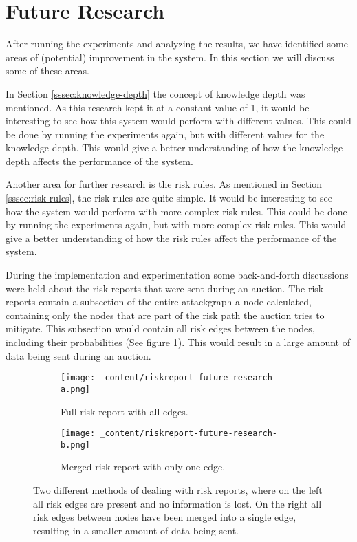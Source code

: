 \section{Future Research}
\label{sec:future-research}

After running the experiments and analyzing the results, we have identified some areas of (potential) improvement in the system. In this section we will discuss some of these areas.

In Section \ref{sssec:knowledge-depth} the concept of knowledge depth was mentioned. As this research kept it at a constant value of 1, it would be interesting to see how this system would perform with different values. This could be done by running the experiments again, but with different values for the knowledge depth. This would give a better understanding of how the knowledge depth affects the performance of the system.

Another area for further research is the risk rules. As mentioned in Section \ref{sssec:risk-rules}, the risk rules are quite simple. It would be interesting to see how the system would perform with more complex risk rules. This could be done by running the experiments again, but with more complex risk rules. This would give a better understanding of how the risk rules affect the performance of the system. 

During the implementation and experimentation some back-and-forth discussions were held about the risk reports that were sent during an auction. The risk reports contain a subsection of the entire attackgraph a node calculated, containing only the nodes that are part of the risk path the auction tries to mitigate. This subsection would contain all risk edges between the nodes, including their probabilities (See figure \ref{fig:riskreport-a}). This would result in a large amount of data being sent during an auction. 

\begin{figure}[H]
    \centering
    \begin{subfigure}[b]{0.4\textwidth}
        \centering
        \texttt{[image: \_content/riskreport-future-research-a.png]}
        \caption{Full risk report with all edges.}
        \label{fig:riskreport-a}
    \end{subfigure}
    \hspace{0.5cm}
    \begin{subfigure}[b]{0.4\textwidth}
        \centering
        \texttt{[image: \_content/riskreport-future-research-b.png]}
        \caption{Merged risk report with only one edge.}
        \label{fig:riskreport-b}
    \end{subfigure}
    \caption{Two different methods of dealing with risk reports, where on the left all risk edges are present and no information is lost. On the right all risk edges between nodes have been merged into a single edge, resulting in a smaller amount of data being sent.}
\end{figure}


